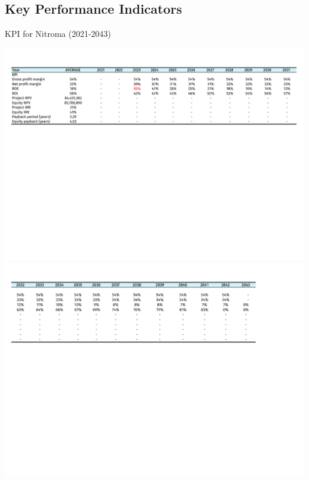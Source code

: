 

\begin{landscape}
\subsection{Key Performance Indicators}
\begin{table}[H]
\label{tab:KPI}
  \caption{KPI for Nitroma (2021-2043)}
\includegraphics[clip, trim=0cm 10cm 0cm 1cm, width=\linewidth]{chapters/Z-support/attachments/KPI1.pdf} \\

\includegraphics[clip, trim=0cm 10cm 0cm 1cm, width=\linewidth]{chapters/Z-support/attachments/KPI2.pdf}
\end{table}
\end{landscape}